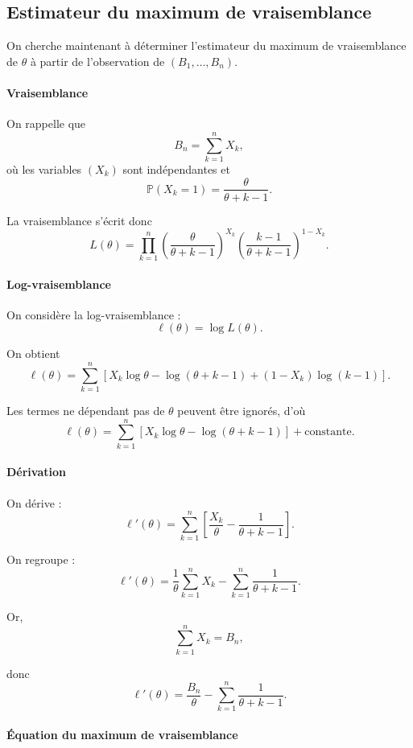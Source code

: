 \documentclass[12pt, a4paper]{article}
\theoremstyle{definition}
\theoremstyle{plain}
\begin{document}
\subsection{Estimateur du maximum de vraisemblance}

On cherche maintenant à déterminer l’estimateur du maximum de vraisemblance de $\theta$ à partir de l’observation de $(B_1, \dots, B_n)$.

\paragraph{Vraisemblance}

On rappelle que
\[
B_n = \sum_{k=1}^n X_k,
\]
où les variables $(X_k)$ sont indépendantes et
\[
\mathbb{P}(X_k = 1) = \frac{\theta}{\theta + k - 1}.
\]

La vraisemblance s’écrit donc
\[
L(\theta) = \prod_{k=1}^{n} \left( \frac{\theta}{\theta + k - 1} \right)^{X_k}
\left( \frac{k - 1}{\theta + k - 1} \right)^{1 - X_k}.
\]

\paragraph{Log-vraisemblance}

On considère la log-vraisemblance :
\[
\ell(\theta) = \log L(\theta).
\]

On obtient
\[
\ell(\theta)
= \sum_{k=1}^{n} \left[
X_k \log \theta
- \log(\theta + k - 1)
+ (1 - X_k) \log(k - 1)
\right].
\]

Les termes ne dépendant pas de $\theta$ peuvent être ignorés, d’où
\[
\ell(\theta)
= \sum_{k=1}^{n} \left[
X_k \log \theta
- \log(\theta + k - 1)
\right] + \text{constante}.
\]

\paragraph{Dérivation}

On dérive :
\[
\ell'(\theta)
= \sum_{k=1}^{n} \left[
\frac{X_k}{\theta}
- \frac{1}{\theta + k - 1}
\right].
\]

On regroupe :
\[
\ell'(\theta)
= \frac{1}{\theta} \sum_{k=1}^{n} X_k
- \sum_{k=1}^{n} \frac{1}{\theta + k - 1}.
\]

Or,
\[
\sum_{k=1}^{n} X_k = B_n,
\]

donc
\[
\ell'(\theta)
= \frac{B_n}{\theta}
- \sum_{k=1}^{n} \frac{1}{\theta + k - 1}.
\]

\paragraph{Équation du maximum de vraisemblance}
\end{document}
